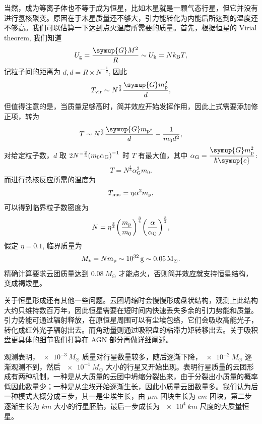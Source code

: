 \documentclass[../天体物理基础.tex]{subfiles}
\begin{document}
当然，成为等离子体也不等于成为恒星，比如木星就是一颗气态行星，但它并没有进行氢核聚变。原因在于木星质量还不够大，引力能转化为内能后所达到的温度还不够高。我们可以估算一下达到点火温度所需要的质量。首先，根据恒星的 Virial theorem, 我们知道
\begin{equation}
U_{\mathrm{g}}=\frac{\symup{G}M^{2}}{R}\sim U_{\mathrm{k}}=Nk_{\mathrm{B}}T,
\end{equation}
记粒子间的距离为 $d, d=R\times N^{-\frac{1}{3}}$, 因此
\begin{equation}
T_{\mathrm{vir}}\sim N^{\frac{2}{3}}\frac{\symup{G}m_{\ce{p}}^{2}}{d},
\end{equation}
但值得注意的是，当质量足够高时，简并效应开始发挥作用，因此上式需要添加修正项，转为
\begin{equation}
T\sim N^{\frac{2}{3}}\frac{\symup{G}m_{\ce{p}^{2}}}{d}-\frac{1}{m_{0}d^{2}},
\end{equation}
对给定粒子数，$d$ 取 $2N^{-\frac{2}{3}}\mleft(m_{0}\alpha_{\mathrm{G}}\mright)^{-1}$ 时 $T$ 有最大值，其中 $\alpha_{\mathrm{G}}=\dfrac{\symup{G}m_{\ce{p}}^{2}}{\hbar\symup{c}}$:
\begin{equation}
T=N^{\frac{4}{3}}\alpha_{\mathrm{G}}^{2}m_{0}.
\end{equation}
而进行热核反应所需的温度为
\begin{equation}
T_{\mathrm{nuc}}=\eta\alpha^{2}m_{\ce{p}},
\end{equation}
可以得到临界粒子数密度为
\begin{equation}
N=\eta^{\frac{3}{4}}\mleft(\dfrac{m_{\ce{p}}}{m_{0}}\mright)^{\frac{3}{4}}\mleft(\frac{\alpha}{\alpha_{\mathrm{G}}}\mright)^{\frac{3}{2}},
\end{equation}
假定 $\eta=0.1$, 临界质量为
\begin{equation}
M_{*}=Nm_{\ce{p}}\sim\qty{e32}{g}\sim\qty{0.05}{M_{\odot}}.
\end{equation}
精确计算要求云团质量达到 $\qty{0.08}{M_{\odot}}$ 才能点火，否则简并效应就支持恒星结构，变成褐矮星。

关于恒星形成还有其他一些问题。云团坍缩时会慢慢形成盘状结构，观测上此结构大约只维持数百万年，因此恒星需要在短时间内快速丢失多余的引力势能和质量。引力势能可通过辐射释放，在原恒星周围可以有尘埃包络，它们会吸收高能光子，转化成红外光子辐射出去。而角动量则通过吸积盘的粘滞力矩转移出去。关于吸积盘更具体的细节我们打算在 AGN 部分再做详细阐述。

观测表明，$\qty{e-3}{M_{\odot}}$ 质量对行星数量较多，随后逐渐下降，$\qty{e-2}{M_{\odot}}$ 逐渐观测不到，然后 $\qty{e-1}{M_{\odot}}$ 大小的行星又开始出现。表明行星质量的云团形成有两种机制，一种是从大质量的云团中坍缩分裂出来，由于分裂出小质量的概率低因此数量少；一种是从尘埃开始逐渐生长，因此小质量云团数量多。我们认为后一种模式大概分成三步，其一是尘埃生长，由 $\unit{\mu m}$ 团块生长为 $\unit{cm}$ 团块，第二步逐渐生长为 $\unit{km}$ 大小的行星胚胎，最后一步成长为 $\qty{e4}{km}$ 尺度的大质量恒星。
\end{document}
